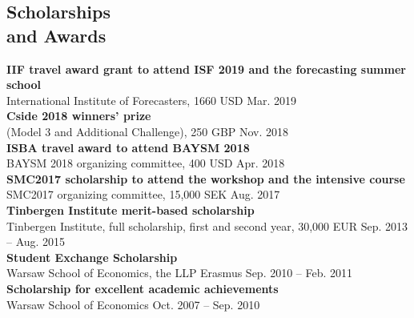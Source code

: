 \documentclass[margin,line]{resume}
\begin{document}
\begin{resume}


 


   \section{\mysidestyle Scholarships \\and Awards}	
   	\textbf{IIF travel award grant to attend ISF 2019 and the forecasting summer school} \\
   	International Institute of Forecasters, 1660 USD \hfill Mar. 2019 \vspace{1.5mm} \\ 
   	\textbf{Cside 2018 winners' prize} \\
   	(Model 3 and Additional Challenge), 250 GBP \hfill Nov. 2018 \vspace{1.5mm} \\ 
   	\textbf{ISBA travel award to attend BAYSM 2018}\\ BAYSM 2018 organizing committee, 400 USD \hfill Apr. 2018 \vspace{1.5mm} \\ 
   	\textbf{SMC2017 scholarship to attend the workshop and the intensive course}\\ SMC2017 organizing committee, 15,000 SEK \hfill Aug. 2017 \vspace{1.5mm} \\   
   	\textbf{Tinbergen Institute merit-based scholarship}\\ Tinbergen Institute, full scholarship, first and second year, 30,000 EUR \hfill Sep. 2013 -- Aug. 2015\vspace{1.5mm} \\   
       \textbf{Student Exchange Scholarship}\\  Warsaw School of Economics, the LLP Erasmus \hfill Sep. 2010 -- Feb. 2011\vspace{1.5mm} \\
       \textbf{Scholarship for excellent academic achievements}\\ Warsaw School of Economics \hfill Oct. 2007 -- Sep. 2010 

\newpage	


\end{resume}
\end{document}
